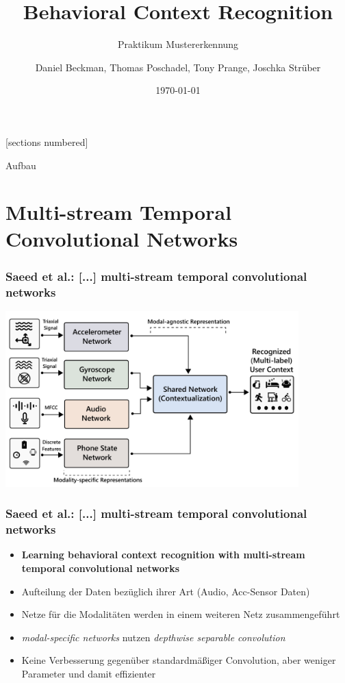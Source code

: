 \documentclass[10pt,%
	wide,%
	xcolor={x11names},%
	hyperref={colorlinks},%
	pantone312,%
	handout,%
	]{beamer}
\author{Daniel Beckman, Thomas Poschadel, Tony Prange, Joschka Strüber}
\title{Behavioral Context Recognition}
\subtitle{Praktikum Mustererkennung}
\date{\today}
\begin{document}
[sections numbered]

\begin{frame}[plain]
  \maketitle
\end{frame}

\begin{frame}[t]{Aufbau}
\end{frame}

\section{Multi-stream Temporal Convolutional Networks}

\begin{frame}
\frametitle{Saeed et al.: [...] multi-stream temporal convolutional networks}
\begin{center}
	\includegraphics[width=0.85\textwidth]{img/multi-modal-network.png}
\end{center}
\end{frame}

\begin{frame}
\frametitle{Saeed et al.: [...] multi-stream temporal convolutional networks}
\begin{itemize}
\item \textbf{Learning behavioral context recognition with multi-stream temporal convolutional networks} \cite{saeed2018learning}
\item Aufteilung der Daten bezüglich ihrer Art (Audio, Acc-Sensor Daten)
\item Netze für die Modalitäten werden in einem weiteren Netz zusammengeführt
\item \emph{modal-specific networks} nutzen \emph{depthwise separable convolution}
\item Keine Verbesserung gegenüber standardmäßiger Convolution, aber weniger Parameter und damit effizienter
\end{itemize}
\end{frame}
\end{document}
